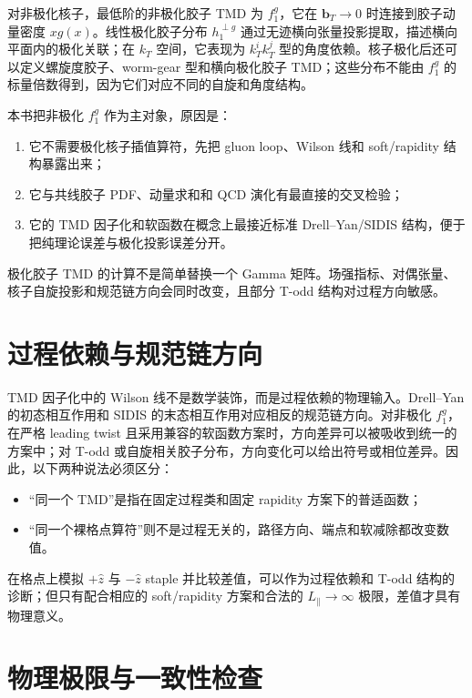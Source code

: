 \documentclass[UTF8,12pt,a4paper,twoside,openany]{ctexbook}
\newcommand{\bT}{\boldsymbol b_T}
\begin{document}
对非极化核子，最低阶的非极化胶子 TMD 为 \(f_1^g\)，它在 \(\bT\to0\) 时连接到胶子动量密度 \(xg(x)\)。线性极化胶子分布 \(h_1^{\perp g}\) 通过无迹横向张量投影提取，描述横向平面内的极化关联；在 \(k_T\) 空间，它表现为 \(k_T^ik_T^j\) 型的角度依赖\cite{Meissner2007}。核子极化后还可以定义螺旋度胶子、worm-gear 型和横向极化胶子 TMD；这些分布不能由 \(f_1^g\) 的标量倍数得到，因为它们对应不同的自旋和角度结构。

本书把非极化 \(f_1^g\) 作为主对象，原因是：
\begin{enumerate}
  \item 它不需要极化核子插值算符，先把 gluon loop、Wilson 线和 soft/rapidity 结构暴露出来；
  \item 它与共线胶子 PDF、动量求和和 QCD 演化有最直接的交叉检验；
  \item 它的 TMD 因子化和软函数在概念上最接近标准 Drell--Yan/SIDIS 结构，便于把纯理论误差与极化投影误差分开。
\end{enumerate}
极化胶子 TMD 的计算不是简单替换一个 Gamma 矩阵。场强指标、对偶张量、核子自旋投影和规范链方向会同时改变，且部分 T-odd 结构对过程方向敏感\cite{Egerer2022,JiReview2021}。

\section{过程依赖与规范链方向}

TMD 因子化中的 Wilson 线不是数学装饰，而是过程依赖的物理输入。Drell--Yan 的初态相互作用和 SIDIS 的末态相互作用对应相反的规范链方向。对非极化 \(f_1^g\)，在严格 leading twist 且采用兼容的软函数方案时，方向差异可以被吸收到统一的方案中；对 T-odd 或自旋相关胶子分布，方向变化可以给出符号或相位差异。因此，以下两种说法必须区分：
\begin{itemize}
  \item “同一个 TMD”是指在固定过程类和固定 rapidity 方案下的普适函数；
  \item “同一个裸格点算符”则不是过程无关的，路径方向、端点和软减除都改变数值。
\end{itemize}
在格点上模拟 \(+\hat z\) 与 \(-\hat z\) staple 并比较差值，可以作为过程依赖和 T-odd 结构的诊断；但只有配合相应的 soft/rapidity 方案和合法的 \(L_\parallel\to\infty\) 极限，差值才具有物理意义。

\section{物理极限与一致性检查}
\end{document}
